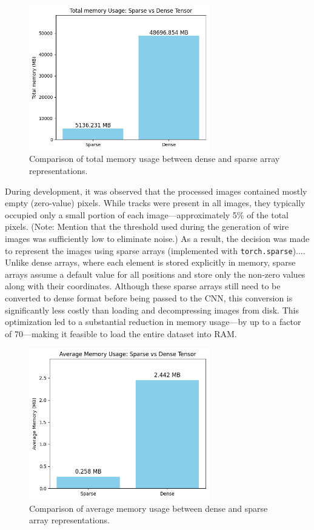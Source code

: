 \documentclass{pracalicmgr}
\begin{document}
\begin{figure}[H]
    \centering
    \includegraphics[width=0.7\textwidth]{src/totalSparseDense.png}
    \caption{Comparison of total memory usage between dense and sparse array representations.}
\end{figure}

During development, it was observed that the processed images contained mostly empty (zero-value) pixels. While tracks were present in all images, they typically occupied only a small portion of each image—approximately 5\% of the total pixels. (Note: Mention that the threshold used during the generation of wire images was sufficiently low to eliminate noise.) As a result, the decision was made to represent the images using sparse arrays (implemented with \texttt{torch.sparse}).... Unlike dense arrays, where each element is stored explicitly in memory, sparse arrays assume a default value for all positions and store only the non-zero values along with their coordinates. Although these sparse arrays still need to be converted to dense format before being passed to the CNN, this conversion is significantly less costly than loading and decompressing images from disk. This optimization led to a substantial reduction in memory usage—by up to a factor of 70—making it feasible to load the entire dataset into RAM.

\begin{figure}[H]
    \centering
    \includegraphics[width=0.7\textwidth]{src/sparseDenseComp.png}
    \caption{Comparison of average memory usage between dense and sparse array representations.}
\end{figure}
\end{document}
